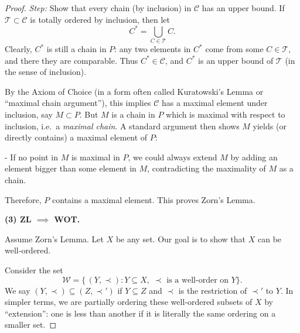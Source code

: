 \documentclass[12pt]{article}
\theoremstyle{definition} %
\theoremstyle{plain} %
\begin{document}
\begin{proof}
                                \textit{Step:} Show that every chain (by inclusion) in $\mathcal{C}$ has an upper bound.  
                                If $\mathcal{T} \subset \mathcal{C}$ is totally ordered by inclusion, then let 
                                \[
                                C^* = \bigcup_{C \in \mathcal{T}} C.
                                \]
                                Clearly, $C^*$ is still a chain in $P$: any two elements in $C^*$ come from some $C \in \mathcal{T}$, and there they are comparable. Thus $C^* \in \mathcal{C}$, and $C^*$ is an upper bound of $\mathcal{T}$ (in the sense of inclusion).
                                
                                By the Axiom of Choice (in a form often called Kuratowski's Lemma or “maximal chain argument”), this implies $\mathcal{C}$ has a maximal element under inclusion, say $M \subset P$. But $M$ is a chain in $P$ which is maximal with respect to inclusion, i.e.\ a \emph{maximal chain}. A standard argument then shows $M$ yields (or directly contains) a maximal element of $P$:
                                
                                - If no point in $M$ is maximal in $P$, we could always extend $M$ by adding an element bigger than some element in $M$, contradicting the maximality of $M$ as a chain. 
                                
                                Therefore, $P$ contains a maximal element. This proves Zorn’s Lemma.
                                
                                \medskip
                                
                                \noindent
                                \textbf{(3) \;ZL $\implies$ WOT.}
                                
                                Assume Zorn’s Lemma. Let $X$ be any set. Our goal is to show that $X$ can be well‐ordered.
                                
                                Consider the set 
                                \[
                                \mathcal{W} = \{\,(Y, \prec)\colon Y \subseteq X,\; \prec \text{ is a well‐order on }Y\}.
                                \]
                                We say \((Y,\prec) \subseteq (Z,\prec')\) if $Y \subseteq Z$ and $\prec$ is the restriction of $\prec'$ to $Y$. In simpler terms, we are partially ordering these well‐ordered subsets of $X$ by “extension”: one is less than another if it is literally the same ordering on a smaller set.
                                

\end{proof}
\end{document}
